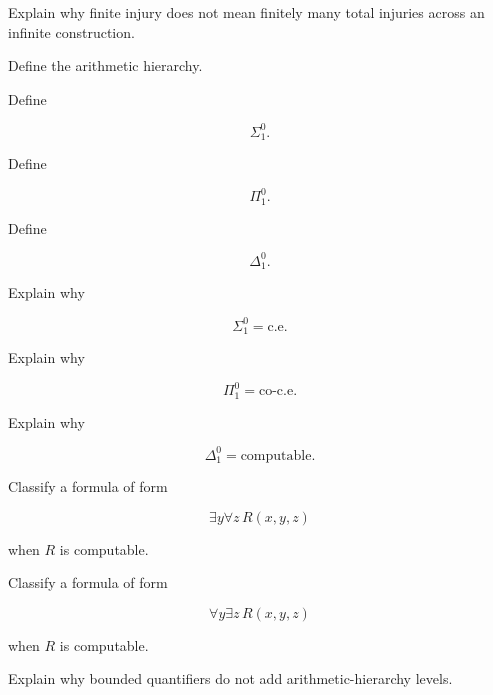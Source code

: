 \begin{exercise}[3]
Explain why finite injury does not mean finitely many total injuries across
an infinite construction.
\end{exercise}

\begin{exercise}[2]
Define the arithmetic hierarchy.
\end{exercise}

\begin{exercise}[2]
Define

\[
\Sigma^0_1.
\]
\end{exercise}

\begin{exercise}[2]
Define

\[
\Pi^0_1.
\]
\end{exercise}

\begin{exercise}[2]
Define

\[
\Delta^0_1.
\]
\end{exercise}

\begin{exercise}[3]
Explain why

\[
\Sigma^0_1
=
\text{c.e.}
\]
\end{exercise}

\begin{exercise}[3]
Explain why

\[
\Pi^0_1
=
\text{co-c.e.}
\]
\end{exercise}

\begin{exercise}[3]
Explain why

\[
\Delta^0_1
=
\text{computable}.
\]
\end{exercise}

\begin{exercise}[3]
Classify a formula of form

\[
\exists y\forall z\,R(x,y,z)
\]

when \(R\) is computable.
\end{exercise}

\begin{exercise}[3]
Classify a formula of form

\[
\forall y\exists z\,R(x,y,z)
\]

when \(R\) is computable.
\end{exercise}

\begin{exercise}[3]
Explain why bounded quantifiers do not add arithmetic-hierarchy levels.
\end{exercise}


